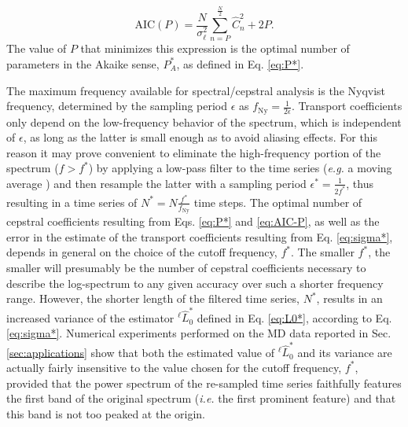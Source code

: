 \begin{equation}
\mathrm{AIC}(P)=\frac{N}{\sigma_\ell^{2}}\sum_{n=P}^\frac{N}{2} \hat{C}_{n}^{2}+2P. \label{eq:AIC-P}
\end{equation}
The value of $P$ that minimizes this expression is the optimal number of parameters in the Akaike sense, $P_A^*$, as defined in Eq. \eqref{eq:P*}.

The maximum frequency available for spectral/cepstral analysis is the Nyqvist frequency,\cite{Oppenheim1999} determined by the sampling period $\epsilon$ as $f_{\mathrm{Ny}}=\frac{1}{2\epsilon}$. Transport coefficients only depend on the low-frequency behavior of the spectrum, which is independent of $\epsilon$, as long as the latter is small enough as to avoid aliasing effects. For this reason it may prove convenient to eliminate the high-frequency portion of the spectrum ($f>f^*$) by applying a low-pass filter to the time series (\emph{e.g.} a moving average \cite{MovingAverage}) and then resample the latter with a sampling period $\epsilon^*=\frac{1}{2f^*}$, thus resulting in a time series of $N^*=N\frac{f^*}{f_{\mathrm{Ny}}}$ time steps.
The optimal number of cepstral coefficients resulting from Eqs. \eqref{eq:P*} and \eqref{eq:AIC-P}, as well as the error in the estimate of the transport coefficients resulting from Eq. \eqref{eq:sigma*}, depends in general on the choice of the cutoff frequency,  $f^*$. The smaller $f^*$, the smaller will presumably be the number of cepstral coefficients necessary to describe the log-spectrum to any given accuracy over such a shorter frequency range. However, the shorter length of the filtered time series, $N^*$, results in an increased variance of the estimator $^\ell{\hat L^*_0}$ defined in Eq. \eqref{eq:L0*}, according to Eq. \eqref{eq:sigma*}. Numerical experiments performed on the MD data reported in Sec. \ref{sec:applications} show that both the estimated value of $^\ell{\hat L^*_0}$ and its variance are actually fairly insensitive to the value chosen for the cutoff frequency, $f^*$, provided that the power spectrum of the re-sampled time series faithfully features the first band of the original spectrum (\emph{i.e.} the first prominent feature) and that this band is not too peaked at the origin.

